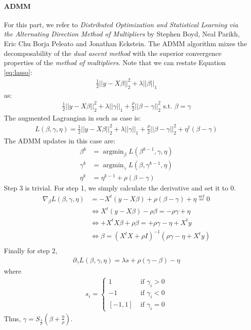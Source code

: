 \documentclass[12pt, leqno]{article}
\newcommand{\norm}[1]{\left|\left|#1\right|\right|}
\DeclareMathOperator*{\argmin}{argmin}
\theoremstyle{remark}
\begin{document}
\paragraph{ADMM} For this part, we refer to {\it Distributed Optimization and Statistical
Learning via the Alternating Direction
Method of Multipliers} by Stephen Boyd, Neal Parikh, Eric Chu
Borja Peleato and Jonathan Eckstein. The ADMM algorithm mixes the decomposability of the \textit{dual ascent method} with the superior convergence properties of the \textit{method of multipliers}. Note that we can restate
Equation \ref{eq:lasso}:
\begin{align*}
\frac{1}{2}\norm{y- X \beta}_2^2 + \lambda
  \norm{\beta}_1 
\end{align*}
as: 
\begin{align*}
 \frac{1}{2}\norm{y- X \beta}_2^2 + \lambda
  \norm{\gamma}_1 + \frac{\rho}{2} \norm{\beta - \gamma}_2^2 \text{ s.t. } \beta = \gamma
\end{align*}
The augmented Lagrangian in such as case is:
\begin{align*}
L(\beta, \gamma, \eta) = \frac{1}{2}\norm{y- X \beta}_2^2 + \lambda 
  \norm{\gamma}_1 + \frac{\rho}{2} \norm{\beta - \gamma}_2^2 + \eta^t(\beta - \gamma) 
\end{align*}
The ADMM updates in this case are:
\begin{align*}
 \beta^{k} &= \argmin_\beta L(\beta^{k-1}, \gamma, \eta) \\
\gamma^{k} &= \argmin_\gamma L(\beta, \gamma^{k-1}, \eta) \\
\eta^{k} &= \eta^{k-1}+ \rho(\beta - \gamma)
\end{align*}
Step 3 is trivial. For step 1, we simply calculate the derivative and
set it to 0. 
\begin{align*}
\nabla_\beta L(\beta, \gamma, \eta) &=  -X^t (y -X \beta) + \rho (\beta
  - \gamma) + \eta \overset{set}{=} 0\\
&\iff X^t (y -X \beta) - \rho \beta = - \rho \gamma + \eta \\ 
&\iff + X^t X \beta + \rho \beta = + \rho \gamma - \eta + X^ty \\ 
&\iff \beta =  (X^t X + \rho I)^{-1}  (\rho \gamma - \eta + X^ty) \\ 
\end{align*}
Finally for step 2, 
\begin{align*}
\partial_\gamma L(\beta, \gamma, \eta) = \lambda s + \rho (\gamma -
  \beta)  - \eta
\end{align*}
where 
\begin{align*}
s_i = \begin{cases}
1 &\text{ if } \gamma_i > 0 \\
-1 &\text{ if } \gamma_i< 0 \\
[-1,1] &\text{ if } \gamma_i = 0
\end{cases}
\end{align*}
Thus, $\gamma = S_{\frac{\lambda}{\rho}}(\beta + \frac{\eta}{\rho})$.
\end{document}
